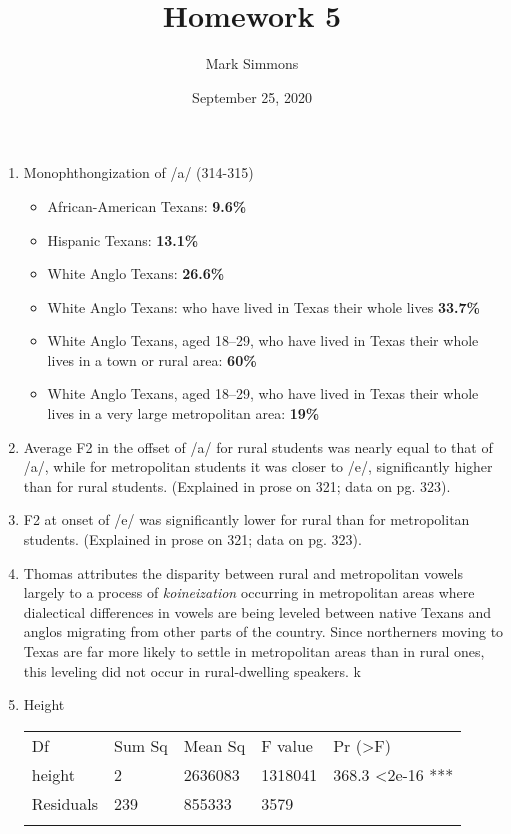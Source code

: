 \documentclass[12pt]{article}
\title{Homework 5}
\author{Mark Simmons}
\date{September 25, 2020}
\begin{document}
\maketitle

\begin{enumerate}
\item Monophthongization of /a/ (314-315)
\begin{itemize}
    \item African-American Texans: \textbf{9.6\%}
    \item Hispanic Texans: \textbf{13.1\%}
    \item White Anglo Texans: \textbf{26.6\%}
    \item White Anglo Texans: who have lived in Texas their whole lives \textbf{33.7\%}
    \item White Anglo Texans, aged 18–29, who have lived in Texas their whole lives in a
    town or rural area: \textbf{60\%}
    \item White Anglo Texans, aged 18–29, who have lived in Texas their whole lives in a
    very large metropolitan area: \textbf{19\%}
\end{itemize}
\item Average F2 in the offset of /a/ for rural students was nearly equal to that of /a/,
while for metropolitan students it was closer to /e/, significantly higher than for rural students.
(Explained in prose on 321; data on pg. 323).
\item F2 at onset of /e/ was significantly lower for rural than for metropolitan students.
(Explained in prose on 321; data on pg. 323).
\item Thomas attributes the disparity between rural and metropolitan vowels largely to a process of
\textit{koineization} occurring in metropolitan areas where dialectical differences in vowels are being
leveled between native Texans and anglos migrating from other parts of the country. Since northerners
moving to Texas are far more likely to settle in metropolitan areas than in rural ones, this leveling
did not occur in rural-dwelling speakers. k

\item Height\\
    \begin{tabular}{lllll}
    Df        & Sum Sq & Mean Sq & F value & Pr (\textgreater{}F)       \\
    height    & 2      & 2636083 & 1318041 & 368.3 \textless{}2e-16 *** \\
    Residuals & 239    & 855333  & 3579    &                            \\
              &        &         &         &                           
    \end{tabular}


\end{enumerate}
\end{document}
